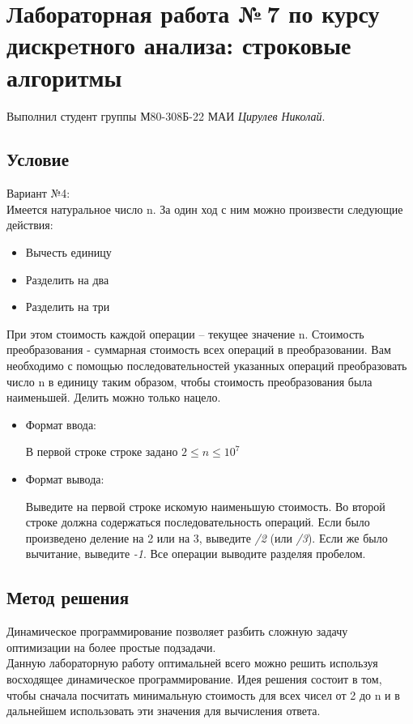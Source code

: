 \documentclass[12pt]{article}
\begin{document}
\section*{Лабораторная работа №\,7 по курсу дискрeтного анализа: строковые алгоритмы}

Выполнил студент группы М80-308Б-22 МАИ \textit{Цирулев Николай}.

\subsection*{Условие}
Вариант №4:\\
Имеется натуральное число n. За один ход с ним можно произвести следующие действия:
\begin{itemize}
\item
    Вычесть единицу
\item
    Разделить на два
\item
    Разделить на три
\end{itemize}
При этом стоимость каждой операции – текущее значение n. Стоимость преобразования - суммарная стоимость всех операций в преобразовании. Вам необходимо с помощью последовательностей указанных операций преобразовать число n в единицу таким образом, чтобы стоимость преобразования была наименьшей. Делить можно только нацело. 
\begin{itemize}
\item
    Формат ввода:
    
    В первой строке строке задано $2 \leq n \leq 10^{7}$

\item
    Формат вывода:
    
    Выведите на первой строке искомую наименьшую стоимость. Во второй строке должна содержаться последовательность операций. Если было произведено деление на 2 или на 3, выведите \textit{/2} (или \textit{/3}). Если же было вычитание, выведите \textit{-1}. Все операции выводите разделяя пробелом.
\end{itemize}

\subsection*{Метод решения}
Динамическое программирование позволяет разбить сложную задачу оптимизации на более простые подзадачи. \\
Данную лабораторную работу оптимальней всего можно решить используя восходящее динамическое программирование. Идея решения состоит в том, чтобы сначала посчитать минимальную стоимость для всех чисел от 2 до n и в дальнейшем использовать эти значения для вычисления ответа.
\end{document}
